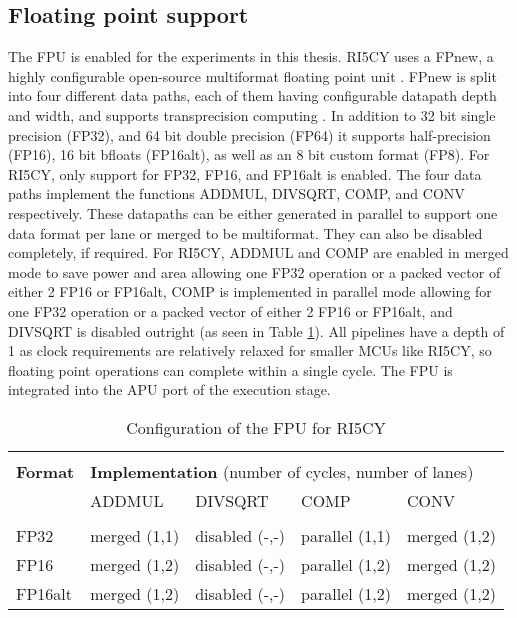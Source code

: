 \documentclass[../bachelor_paper.tex]{subfiles}
\begin{document}
\subsection{Floating point support}
    \label{sub:plat/ip/fpu}
The \ac{FPU} is enabled for the experiments in this thesis. RI5CY uses a FPnew, a highly configurable open-source multiformat floating point unit \cite{machFPnewOpenSourceMultiformat2021}. FPnew is split into four different data paths, each of them having configurable datapath depth and width, and supports transprecision computing \cite{malossiTransprecisionComputingParadigm2018}. In addition to 32 bit single precision (FP32), and 64 bit double precision (FP64) it supports half-precision (FP16), 16 bit bfloats (FP16alt), as well as an 8 bit custom format (FP8). For RI5CY, only support for FP32, FP16, and FP16alt is enabled. The four data paths implement the functions \ac{ADDMUL}, \ac{DIVSQRT}, \ac{COMP}, and \ac{CONV} respectively. These datapaths can be either generated in parallel to support one data format per lane or merged to be multiformat. They can also be disabled completely, if required. For RI5CY, \ac{ADDMUL} and \ac{COMP} are enabled in merged mode to save power and area allowing one FP32 operation or a packed vector of either 2 FP16 or FP16alt, \ac{COMP} is implemented in parallel mode allowing for one FP32 operation or a packed vector of either 2 FP16 or FP16alt, and \ac{DIVSQRT} is disabled outright (as seen in Table \ref{tab:plat/base/fpu}). All pipelines have a depth of 1 as clock requirements are relatively relaxed for smaller \acp{MCU} like RI5CY, so floating point operations can complete within a single cycle. The \ac{FPU} is integrated into the \ac{APU} port of the execution stage.

\begin{table}
    \centering
    \begin{tabular}{lllll}
        \hline \\[-0.9em]
        \textbf{Format} & \multicolumn{4}{l}{\textbf{Implementation} (number of cycles, number of lanes)}   \\
                        & \ac{ADDMUL}   & \ac{DIVSQRT}  & \ac{COMP}     & \ac{CONV}     \\
        \hline \\[-0.9em]
        FP32            & merged (1,1)  & disabled (-,-)& parallel (1,1)& merged (1,2)  \\
        FP16            & merged (1,2)  & disabled (-,-)& parallel (1,2)& merged (1,2)  \\
        FP16alt         & merged (1,2)  & disabled (-,-)& parallel (1,2)& merged (1,2)  \\
        \hline
    \end{tabular}
    \caption{Configuration of the FPU for RI5CY \cite{machFPnewOpenSourceMultiformat2021}}
    \label{tab:plat/base/fpu}
\end{table}
\end{document}
